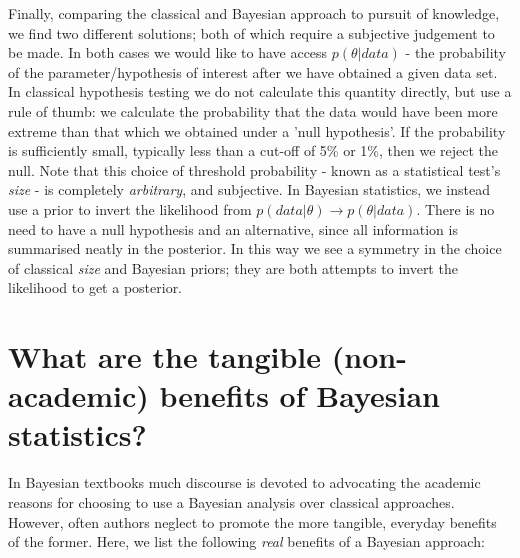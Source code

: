 \documentclass[11pt,fullpage]{book}
\begin{document}
Finally, comparing the classical and Bayesian approach to pursuit of knowledge, we find two different solutions; both of which require a subjective judgement to be made. In both cases we would like to have access $p(\theta|data)$ - the probability of the parameter/hypothesis of interest after we have obtained a given data set. In classical hypothesis testing we do not calculate this quantity directly, but use a rule of thumb: we calculate the probability that the data would have been more extreme than that which we obtained under a 'null hypothesis'. If the probability is sufficiently small, typically less than a cut-off of 5\% or 1\%, then we reject the null. Note that this choice of threshold probability - known as a statistical test's \textit{size} - is completely \textit{arbitrary}, and subjective. In Bayesian statistics, we instead use a prior to invert the likelihood from $p(data|\theta)\rightarrow p(\theta|data)$. There is no need to have a null hypothesis and an alternative, since all information is summarised neatly in the posterior. In this way we see a symmetry in the choice of classical \textit{size} and Bayesian priors; they are both attempts to invert the likelihood to get a posterior. 

\section{What are the tangible (non-academic) benefits of Bayesian statistics?}
In Bayesian textbooks much discourse is devoted to advocating the academic reasons for choosing to use a Bayesian analysis over classical approaches. However, often authors neglect to promote the more tangible, everyday benefits of the former. Here, we list the following \textit{real} benefits of a Bayesian approach:
\end{document}
